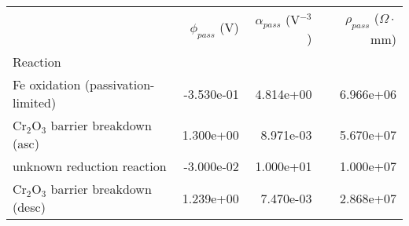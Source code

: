 \begin{tabular}{lrrr}
\toprule
{} &  $\phi_{pass}$ (V) &  $\alpha_{pass}$ (V$^{-3}$) &  $\rho_{pass}$ ($\Omega \cdot$mm) \\
Reaction                             &                    &                             &                                   \\
\midrule
Fe oxidation (passivation-limited)   &         -3.530e-01 &                   4.814e+00 &                         6.966e+06 \\
Cr$_2$O$_3$ barrier breakdown (asc)  &          1.300e+00 &                   8.971e-03 &                         5.670e+07 \\
unknown reduction reaction           &         -3.000e-02 &                   1.000e+01 &                         1.000e+07 \\
Cr$_2$O$_3$ barrier breakdown (desc) &          1.239e+00 &                   7.470e-03 &                         2.868e+07 \\
\bottomrule
\end{tabular}
